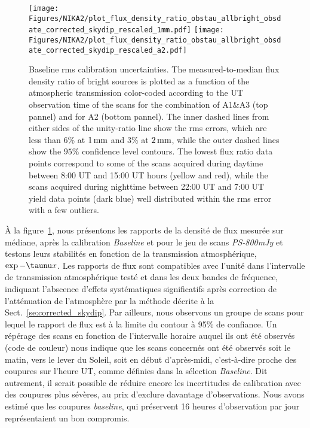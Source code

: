 \begin{figure}[!thbp]
  \begin{center}
    \texttt{[image: Figures/NIKA2/plot\_flux\_density\_ratio\_obstau\_allbright\_obsdate\_corrected\_skydip\_rescaled\_1mm.pdf]}
    \hfill
    \texttt{[image: Figures/NIKA2/plot\_flux\_density\_ratio\_obstau\_allbright\_obsdate\_corrected\_skydip\_rescaled\_a2.pdf]} 
    \caption[Baseline calibration rms error estimate]{Baseline
      rms calibration uncertainties. The
      measured-to-median flux density ratio of bright sources is
      plotted as a function of the atmospheric transmission
      color-coded according to the UT
      observation time of the scans for the combination of A1$\&$A3
      (top pannel)
      and for A2 (bottom pannel).
      The inner dashed lines from either sides of the
      unity-ratio line show the rms errors, which
      are less than 6\% at $1\,\rm{mm}$ and 3\% at $2\,\rm{mm}$, while
      the outer dashed lines show the $95\%$ confidence level contours.
      The lowest flux ratio data points correspond to some of the
      scans acquired during daytime between 8:00 UT and 15:00 UT
      hours (yellow and red), while the scans acquired during nighttime
      between 22:00 UT and 7:00 UT yield data points (dark blue)
      well distributed within the rms error with a few outliers.}
    \label{fig:allbright_rms_corrected_skydip}
  \end{center}
\end{figure}
%
\`A la figure~\ref{fig:allbright_rms_corrected_skydip}, nous
présentons les rapports de la densité de flux mesurée sur médiane,
après la calibration \emph{Baseline} et pour
le jeu de scans \emph{PS-800mJy} et testons leurs stabilités en
fonction de la transmission atmosphérique, $\exp{-\taunu x}$. Les
rapports de flux sont compatibles avec l'unité  dans l'intervalle de
transmission atmosphérique testé et dans les deux bandes de fréquence,
indiquant l'abscence d'effets systématiques significatifs après
correction de l'atténuation de l'atmosphère par la méthode décrite à
la Sect.~\ref{se:corrected_skydip}. Par ailleurs, nous observons un
groupe de scans pour lequel le rapport de flux est à la limite du
contour à 95\% de confiance. Un répérage des scans en fonction de
l'intervalle horaire auquel ils ont été observés (code de couleur)
nous indique que les scans concernés ont été observés soit le matin,
vers le lever du Soleil, soit en début d'après-midi, c'est-à-dire
proche des coupures sur l'heure UT, comme définies dans la sélection
\emph{Baseline}. Dit autrement, il serait possible de réduire encore
les incertitudes de calibration avec des coupures plus sévères, au
prix d'exclure davantage d'observations. Nous avons estimé que les
coupures \emph{baseline}, qui préservent 16 heures d'observation par
jour représentaient un bon compromis.

